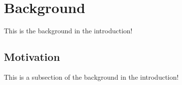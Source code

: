 \section{Background\label{introduction:background}}
This is the background in the introduction!

\subsection{Motivation\label{sec:introduction:motivation}}
This is a subsection of the background in the introduction!